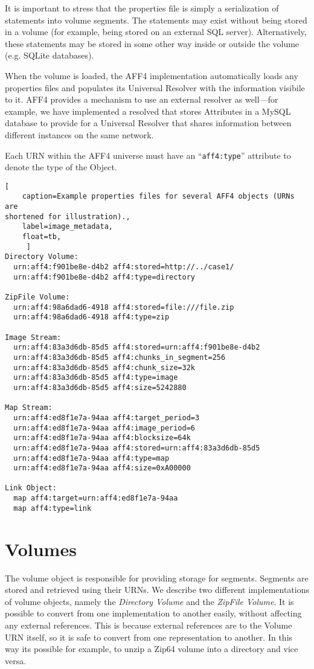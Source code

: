 \documentclass[10pt, conference]{IEEEtran}
\begin{document}
{{It is important to stress that the properties file is simply a
serialization of statements into volume segments. The statements may
exist without being stored in a volume (for example, being stored on
an external SQL server). Alternatively, these statements may be stored
in some other way inside or outside the volume (e.g. SQLite
databases).

When the volume is loaded, the AFF4 implementation automatically loads
any properties files and populates its Universal Resolver with the
information visibile to it. AFF4 provides a mechanism to use an
external resolver as well---for example, we have implemented a
resolved that stores Attributes in a MySQL database to provide for a
Universal Resolver that shares information between different instances
on the same network.

Each URN within the AFF4 universe must have an ``\texttt{aff4:type}''
attribute to denote the type of the Object.

\begin{lstlisting}[
	caption=Example properties files for several AFF4 objects (URNs are
shortened for illustration).,
	label=image_metadata,
	float=tb,
	 ]
Directory Volume:
  urn:aff4:f901be8e-d4b2 aff4:stored=http://../case1/
  urn:aff4:f901be8e-d4b2 aff4:type=directory

ZipFile Volume:
  urn:aff4:98a6dad6-4918 aff4:stored=file:///file.zip
  urn:aff4:98a6dad6-4918 aff4:type=zip

Image Stream:
  urn:aff4:83a3d6db-85d5 aff4:stored=urn:aff4:f901be8e-d4b2
  urn:aff4:83a3d6db-85d5 aff4:chunks_in_segment=256
  urn:aff4:83a3d6db-85d5 aff4:chunk_size=32k
  urn:aff4:83a3d6db-85d5 aff4:type=image
  urn:aff4:83a3d6db-85d5 aff4:size=5242880

Map Stream:
  urn:aff4:ed8f1e7a-94aa aff4:target_period=3
  urn:aff4:ed8f1e7a-94aa aff4:image_period=6
  urn:aff4:ed8f1e7a-94aa aff4:blocksize=64k
  urn:aff4:ed8f1e7a-94aa aff4:stored=urn:aff4:83a3d6db-85d5
  urn:aff4:ed8f1e7a-94aa aff4:type=map
  urn:aff4:ed8f1e7a-94aa aff4:size=0xA00000

Link Object:
  map aff4:target=urn:aff4:ed8f1e7a-94aa
  map aff4:type=link
\end{lstlisting}

\section{Volumes}
The volume object is responsible for providing storage for
segments. Segments are stored and retrieved using their URNs. We
describe two different implementations of volume objects, namely the
{\em Directory Volume} and the {\em ZipFile Volume}. It is possible to
convert from one implementation to another easily, without affecting
any external references. This is because external references are to
the Volume URN itself, so it is safe to convert from one
representation to another. In this way its possible for example, to
unzip a Zip64 volume into a directory and vice versa.

}}
\end{document}
